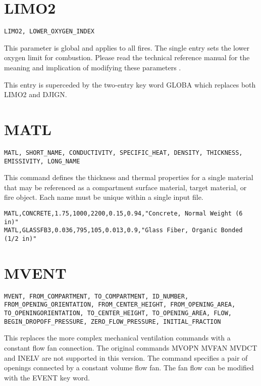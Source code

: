 \section{LIMO2}

\begin{lstlisting}
LIMO2, LOWER_OXYGEN_INDEX
\end{lstlisting}

This parameter is global and applies to all fires. The single entry sets the lower oxygen limit for combustion.  Please read the technical reference manual for the meaning and implication of modifying these parameters \cite{CFAST_Tech_Guide_6}.

This entry is superceded by the two-entry key word GLOBA which replaces both LIMO2 and DJIGN.

\section{MATL}

\begin{lstlisting}
MATL, SHORT_NAME, CONDUCTIVITY, SPECIFIC_HEAT, DENSITY, THICKNESS, EMISSIVITY, LONG_NAME
\end{lstlisting}

This command defines the thickness and thermal properties for a single material that may be referenced as a compartment surface material, target material, or fire object. Each name must be unique within a single input file.

\begin{lstlisting}
MATL,CONCRETE,1.75,1000,2200,0.15,0.94,"Concrete, Normal Weight (6 in)"
MATL,GLASSFB3,0.036,795,105,0.013,0.9,"Glass Fiber, Organic Bonded (1/2 in)"
\end{lstlisting}

\section{MVENT}

\begin{lstlisting}
MVENT, FROM_COMPARTMENT, TO_COMPARTMENT, ID_NUMBER, FROM_OPENING_ORIENTATION, FROM_CENTER_HEIGHT, FROM_OPENING_AREA, TO_OPENINGORIENTATION, TO_CENTER_HEIGHT, TO_OPENING_AREA, FLOW, BEGIN_DROPOFF_PRESSURE, ZERO_FLOW_PRESSURE, INITIAL_FRACTION
\end{lstlisting}

This replaces the more complex mechanical ventilation commands with a constant flow fan connection.  The original commands MVOPN MVFAN MVDCT and INELV are not supported in this version. The command specifies a pair of openings connected by a constant volume flow fan. The fan flow can be modified with the EVENT key word.

